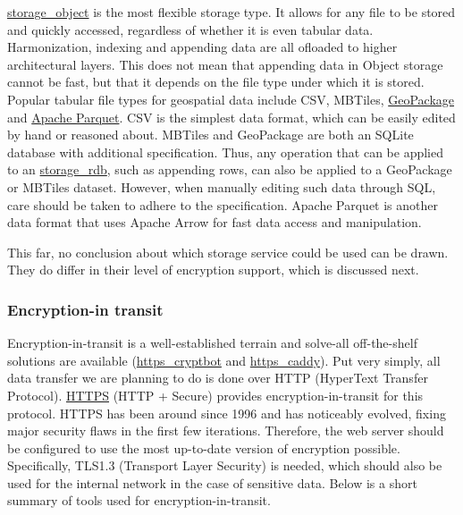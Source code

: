 \documentclass[journal, dvipsnames]{IEEEtran}
\newcommand{\descref}[1]{\hyperref[#1]{\csname#1\endcsname}}
\begin{document}
\descref{storage_object} is the most flexible storage type. It allows for any file to be stored and quickly accessed, regardless of whether it is even tabular data. Harmonization, indexing and appending data are all ofloaded to higher architectural layers. This does not mean that appending data in Object storage cannot be fast, but that it depends on the file type under which it is stored. Popular tabular file types for geospatial data include CSV, MBTiles, \href{http://www.geopackage.org/spec/}{GeoPackage} and \href{https://geoparquet.org/}{Apache Parquet}. CSV is the simplest data format, which can be easily edited by hand or reasoned about. MBTiles and GeoPackage are both an SQLite database with additional specification. Thus, any operation that can be applied to an \descref{storage_rdb}, such as appending rows, can also be applied to a GeoPackage or MBTiles dataset. However, when manually editing such data through SQL, care should be taken to adhere to the specification. Apache Parquet is another data format that uses Apache Arrow for fast data access and manipulation.


This far, no conclusion about which storage service could be used can be drawn. They do differ in their level of encryption support, which is discussed next.

\subsubsection{\texorpdfstring{}{} Encryption-in transit}

 Encryption-in-transit is a well-established terrain and solve-all off-the-shelf solutions are available (\descref{https_cryptbot} and \descref{https_caddy}).
Put very simply, all data transfer we are planning to do is done over HTTP (HyperText Transfer Protocol). \href{https://en.wikipedia.org/wiki/HTTPS}{HTTPS} (HTTP + Secure) provides encryption-in-transit for this protocol.
HTTPS has been around since 1996 and has noticeably evolved, fixing major security flaws in the first few iterations. Therefore, the web server should be configured to use the most up-to-date version of encryption possible. Specifically, TLS1.3 (Transport Layer Security) is needed, which should also be used for the internal network in the case of sensitive data. Below is a short summary of tools used for encryption-in-transit.
\end{document}
